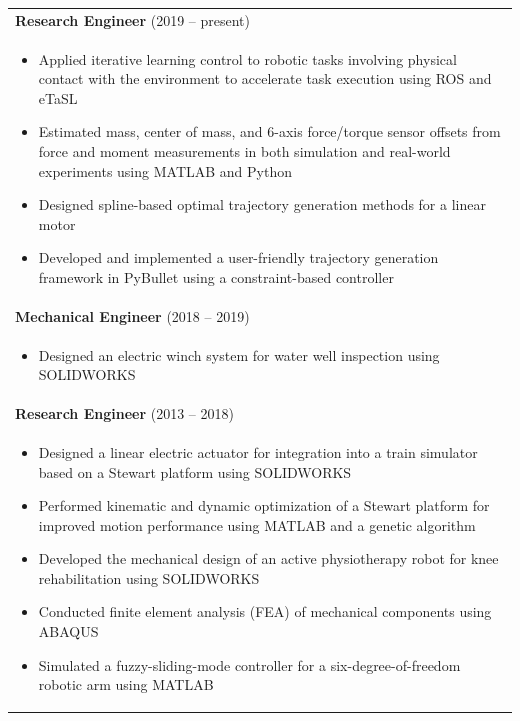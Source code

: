 \documentclass[lighthipster]{simplehipstercv}
\begin{document}
	\begin{table}[h]
		\centering
		\begin{tabularx}{\linewidth}{X} %
			\textbf{Research Engineer} (2019 -- present) \\
			\vspace{-0.3cm}
			\begin{itemize}[leftmargin=1em, itemsep=0pt, topsep=0pt]
				\item Applied iterative learning control to robotic tasks involving physical contact with the environment to accelerate task execution using ROS and eTaSL
				\item Estimated mass, center of mass, and 6-axis force/torque sensor offsets from force and moment measurements in both simulation and real-world experiments using MATLAB and Python
				\item Designed spline-based optimal trajectory generation methods for a linear motor
				\item Developed and implemented a user-friendly trajectory generation framework in PyBullet using a constraint-based controller
			\end{itemize} \\

			\vspace{0.01cm}
			\textbf{Mechanical Engineer} (2018 -- 2019) \\
			\vspace{-0.3cm}
			\begin{itemize}[leftmargin=1em, itemsep=0pt, topsep=0pt]
		    \item Designed an electric winch system for water well inspection using SOLIDWORKS
			\end{itemize} \\

			\vspace{0.01cm}
			\textbf{Research Engineer} (2013 -- 2018) \\
			\vspace{-0.3cm}
			\begin{itemize}[leftmargin=1em, itemsep=0pt, topsep=0pt]
				\item Designed a linear electric actuator for integration into a train simulator based on a Stewart platform using SOLIDWORKS
				\item Performed kinematic and dynamic optimization of a Stewart platform for improved motion performance using MATLAB and a genetic algorithm
				\item Developed the mechanical design of an active physiotherapy robot for knee rehabilitation using SOLIDWORKS
				\item Conducted finite element analysis (FEA) of mechanical components using ABAQUS
				\item Simulated a fuzzy-sliding-mode controller for a six-degree-of-freedom robotic arm using MATLAB
			\end{itemize} \\
		\end{tabularx}
	\end{table}
\end{document}
